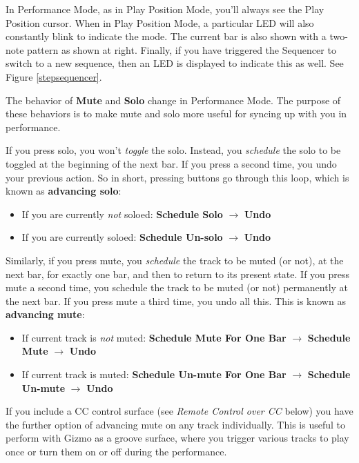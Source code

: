 \documentclass{article}
\newcommand\bump{\vspace{11in}}
\begin{document}
In Performance Mode, as in Play Position Mode, you'll always see the Play Position cursor.  When in Play Position Mode, a particular LED will also constantly blink to indicate the mode.  The current bar is also shown with a two-note pattern as shown at right.  Finally, if you have triggered the Sequencer to switch to a new sequence, then an LED is displayed to indicate this as well. See Figure \ref{stepsequencer}.

The behavior of {\bf Mute} and {\bf Solo} change in Performance Mode. The purpose of these behaviors is to make mute and solo more useful for syncing up with you in performance.

If you press solo, you won't {\it toggle} the solo.  Instead, you {\it schedule} the solo to be toggled at the beginning of the next bar.  If you press a second time, you undo your previous action.  So in short, pressing buttons go through this loop, which is known as {\bf advancing solo}:

\begin{itemize}
\item If you are currently {\it not} soloed: {\bf Schedule Solo} \(\rightarrow\) {\bf Undo}
\item If you are currently soloed: {\bf Schedule Un-solo} \(\rightarrow\) {\bf Undo}
\end{itemize}

\bump 

Similarly, if you press mute, you {\it schedule} the track to be muted (or not), at the next bar, for exactly one bar, and then to return to its present state.  If you press mute a second time, you schedule the track to be muted (or not) permanently at the next bar.  If you press mute a third time, you undo all this.  This is known as {\bf advancing mute}:

\begin{itemize}
\item If current track is {\it not} muted: {\bf Schedule Mute For One Bar} \(\rightarrow\)  {\bf Schedule Mute} \(\rightarrow\) {\bf Undo}
\item If current track is muted: {\bf Schedule Un-mute For One Bar} \(\rightarrow\)  {\bf Schedule Un-mute} \(\rightarrow\) {\bf Undo}
\end{itemize}

If you include a CC control surface (see {\it Remote Control over CC} below) you have the further option of advancing mute on any track individually.  This is useful to perform with Gizmo as a groove surface, where you trigger various tracks to play once or turn them on or off during the performance.
\end{document}
